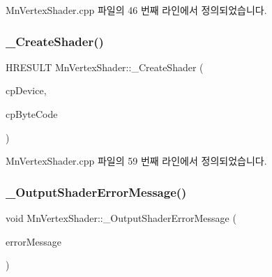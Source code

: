Mn\+Vertex\+Shader.\+cpp 파일의 46 번째 라인에서 정의되었습니다.

\mbox{\label{class_m_n_l_1_1_mn_vertex_shader_adca7dd6c2c00001fe809bbfd93434f51}} 
\subsubsection{\texorpdfstring{\+\_\+\+Create\+Shader()}{\_CreateShader()}}
{\footnotesize\ttfamily H\+R\+E\+S\+U\+LT Mn\+Vertex\+Shader\+::\+\_\+\+Create\+Shader (\begin{DoxyParamCaption}\item[{const \hyperlink{namespace_m_n_l_a1eec210db8f309a4a9ac0d9658784c31}{C\+P\+D3\+D\+Device}}]{cp\+Device,  }\item[{const \hyperlink{namespace_m_n_l_a3716e3bee60c31fe1b7b5dd5a82db59a}{C\+P\+D3\+D\+Blob}}]{cp\+Byte\+Code }\end{DoxyParamCaption})\hspace{0.3cm}{\ttfamily [private]}}



Mn\+Vertex\+Shader.\+cpp 파일의 59 번째 라인에서 정의되었습니다.

\mbox{\label{class_m_n_l_1_1_mn_vertex_shader_af6bb89ea7f32a4cd77792a473b988a5a}} 
\subsubsection{\texorpdfstring{\+\_\+\+Output\+Shader\+Error\+Message()}{\_OutputShaderErrorMessage()}}
{\footnotesize\ttfamily void Mn\+Vertex\+Shader\+::\+\_\+\+Output\+Shader\+Error\+Message (\begin{DoxyParamCaption}\item[{const \hyperlink{namespace_m_n_l_a3716e3bee60c31fe1b7b5dd5a82db59a}{C\+P\+D3\+D\+Blob}}]{error\+Message }\end{DoxyParamCaption})\hspace{0.3cm}{\ttfamily [private]}}



